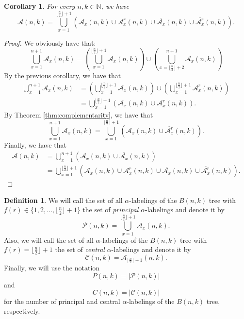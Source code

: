 \documentclass[10pt]{article}
\newtheorem{corollary}{Corollary}[theorem]
\theoremstyle{definition}
\newtheorem{definition}{Definition}
\begin{document}
\begin{corollary}
  \label{cor:alpha-labeling-partition}
  For every $n, k \in \mathbb{N}$, we have
  $$
  \mathcal{A}(n, k) = \bigcup_{x = 1}^{\lfloor \frac{n}{2} \rfloor + 1} \left(\mathcal{A}_x(n, k) \cup \mathcal{A}^r_{x}(n, k) \cup \overline{\mathcal{A}_x}(n, k) \cup \overline{\mathcal{A}^r_{x}}(n, k)\right).
  $$
\end{corollary}

\begin{proof}
  We obviously have that:
  $$
  \bigcup_{x = 1}^{n + 1} \mathcal{A}_x(n, k) = \left( \bigcup_{x = 1}^{\lfloor \frac{n}{2} \rfloor + 1} \mathcal{A}_x(n, k) \right) \cup \left( \bigcup_{x = \lfloor \frac{n}{2} \rfloor + 2}^{n + 1} \mathcal{A}_x(n, k) \right)
  $$
  By the previous corollary, we have that
  \begin{align*}
    \bigcup_{x = 1}^{n + 1} \mathcal{A}_x(n, k) &= \left( \bigcup_{x = 1}^{\lfloor \frac{n}{2} \rfloor + 1} \mathcal{A}_x(n, k) \right) \cup \left( \bigcup_{x = 1}^{\lfloor \frac{n}{2} \rfloor + 1} \mathcal{A}^r_x(n, k) \right)\\
    &= \bigcup_{x = 1}^{\lfloor \frac{n}{2} \rfloor + 1} \left(\mathcal{A}_x(n, k) \cup \mathcal{A}^r_x(n, k)\right).
  \end{align*}
  By Theorem \ref{thm:complementarity}, we have that
  $$
  \bigcup_{x = 1}^{n + 1} \overline{\mathcal{A}_x}(n, k) = \bigcup_{x = 1}^{\lfloor \frac{n}{2} \rfloor + 1} \left(\overline{\mathcal{A}_x}(n, k) \cup \overline{\mathcal{A}^r_x}(n, k)\right).
  $$
  Finally, we have that
  \begin{align*}
    \mathcal{A}(n, k) &= \bigcup_{x = 1}^{n + 1} (\mathcal{A}_x(n, k) \cup \overline{\mathcal{A}_x}(n, k))\\
    &= \bigcup_{x = 1}^{\lfloor \frac{n}{2} \rfloor + 1} \left(\mathcal{A}_x(n, k) \cup \mathcal{A}^r_x(n, k) \cup \overline{\mathcal{A}_x}(n, k) \cup \overline{\mathcal{A}^r_x}(n, k)\right).
  \end{align*}
\end{proof}

\begin{definition}
  We will call the set of all $\alpha$-labelings of the $B(n, k)$ tree with $f(r) \in \{1, 2, \dots, \lfloor \frac{n}{2} \rfloor + 1\}$ the set of \textit{principal} $\alpha$-labelings and denote it by $$\mathcal{P}(n, k) = \bigcup_{x = 1}^{\lfloor \frac{n}{2} \rfloor + 1} \mathcal{A}_x(n, k).$$ Also, we will call the set of all $\alpha$-labelings of the $B(n, k)$ tree with $f(r) = \lfloor \frac{n}{2} \rfloor + 1$ the set of \textit{central} $\alpha$-labelings and denote it by $$\mathcal{C}(n, k) = \mathcal{A}_{\lfloor \frac{n}{2} \rfloor + 1}(n, k).$$ Finally, we will use the notation
  $$ P(n, k) =  |\mathcal{P}(n, k)|$$
  and $$ C(n, k) = |\mathcal{C}(n, k)|$$
  for the number of principal and central $\alpha$-labelings of the $B(n, k)$ tree, respectively.
\end{definition}
\end{document}
